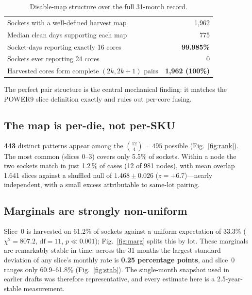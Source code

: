 \documentclass[10pt,conference]{IEEEtran}
\begin{document}
\begin{table}[h]\centering\caption{Disable-map structure over the full 31-month record.}
\begin{tabular}{lr}\toprule
Sockets with a well-defined harvest map & 1{,}962\\
Median clean days supporting each map & 775\\
Socket-days reporting exactly 16 cores & \textbf{99.985\%}\\
Sockets ever reporting 24 cores & 0\\
Harvested cores form complete $(2k,2k{+}1)$ pairs & \textbf{1{,}962 (100\%)}\\
\bottomrule\end{tabular}\end{table}

The perfect pair structure is the central mechanical finding: it matches the POWER9 slice
definition exactly and rules out per-core fusing.

\subsection{The map is per-die, not per-SKU}
\textbf{443} distinct patterns appear among the $\binom{12}{4}=495$ possible
(Fig.~\ref{fig:rank}). The most common (slices 0--3) covers only 5.5\% of sockets. Within a node the two sockets match in just
1.2\,\% of cases (12 of 981 nodes), with mean overlap 1.641 slices against a shuffled null of
$1.468\pm0.026$ ($z=+6.7$)---nearly independent, with a small excess attributable to same-lot
pairing.

\subsection{Marginals are strongly non-uniform}
Slice~0 is harvested on 61.2\% of sockets against a uniform expectation of 33.3\%
($\chi^2=807.2$, $\mathrm{df}=11$, $p\ll0.001$); Fig.~\ref{fig:marg} splits this by lot. These
marginals are remarkably stable in time: across the 31 months the largest standard deviation of any
slice's monthly rate is \textbf{0.25 percentage points}, and slice~0 ranges only 60.9--61.8\%
(Fig.~\ref{fig:stab}). The single-month snapshot used in earlier drafts was therefore
representative, and every estimate here is a 2.5-year-stable measurement.
\end{document}

